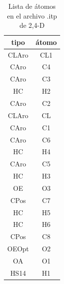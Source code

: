 \begin{table}[!h]
    \centering
    \begin{tabular}{|c|c|}
    \hline
    tipo & átomo\\
    \hline
   CLAro & CL1\\
    CAro &  C4\\
    CAro &  C3\\
      HC &  H2\\
    CAro &  C2\\
   CLAro &  CL\\
    CAro &  C1\\
    CAro &  C6\\
      HC &  H4\\
    CAro &  C5\\
      HC &  H3\\
      OE &  O3\\
    CPos &  C7\\
      HC &  H5\\
      HC &  H6\\
    CPos &  C8\\
   OEOpt &  O2\\
      OA &  O1\\
    HS14 &  H1\\
    \hline
    \end{tabular}
    \caption{Lista de átomos en el archivo .itp de 2,4-D}
    \label{tab:24Ditp}
\end{table}


